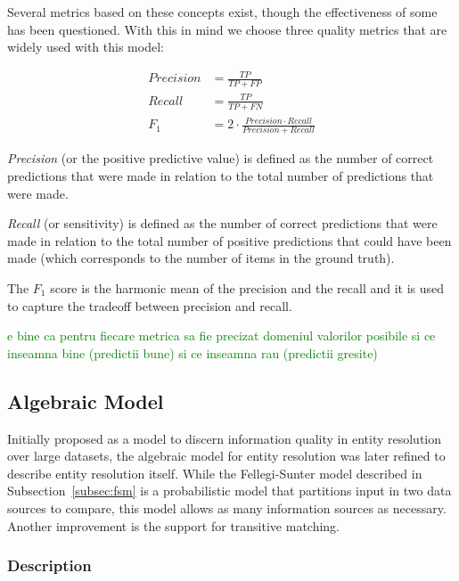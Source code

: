\documentclass[journal]{IEEEtran}
\begin{document}
    Several metrics based on these concepts exist, though the effectiveness of
    some has been questioned\cite{Goga2015}.
    With this in mind we choose three quality metrics that are widely used with
    this model:

    \begin{align}
    Precision &= \frac{TP}{TP+FP}\nonumber \\
    Recall &= \frac{TP}{TP+FN}\nonumber \\
    F_1 &=2 \cdot \frac{Precision \cdot Recall}{Precision+Recall}\nonumber
    \end{align}

    \textit{Precision} (or the positive predictive value) is defined as the
    number of correct predictions that were made in relation to the total number
    of predictions that were made.

    \textit{Recall} (or sensitivity) is defined as the number of correct
    predictions that were made in relation to the total number of positive
    predictions that could have been made (which corresponds to the number of
    items in the ground truth).

    The \textit{$F_1$} score is the harmonic mean of the precision and the
    recall and it is used to capture the tradeoff between precision and
    recall\cite{hitesh2012}.

    \textcolor{green}{e bine ca pentru fiecare metrica sa fie precizat domeniul valorilor posibile si ce inseamna bine (predictii bune) si ce inseamna rau (predictii gresite)}

    \subsection[algebraic]{Algebraic Model}\label{subsec:algebraic}

    Initially proposed as a model to discern information quality in entity
    resolution over large datasets\cite{tal2007algebraic}, the algebraic model
    for entity resolution was later refined to describe entity resolution
    itself\cite{Tal11}.
    While the Fellegi-Sunter model described in Subsection~\ref{subsec:fsm} is a
    probabilistic model that partitions input in two data sources to compare,
    this model allows as many information sources as necessary.
    Another improvement is the support for transitive matching.
    
    \subsubsection[algdesc]{Description}\label{subsubsec:algdesc}
\end{document}
